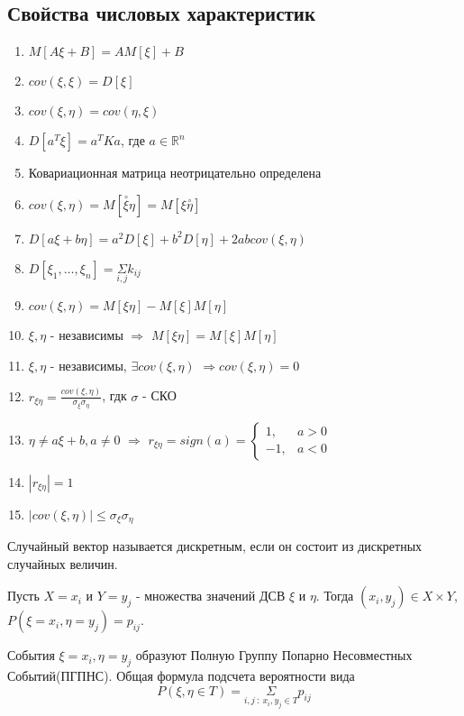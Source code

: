 \subsection{Свойства числовых характеристик}
\begin{enumerate}
    \item $M[A\xi + B] = AM[\xi] + B$
    \item $cov(\xi, \xi) = D[\xi]$
    \item $cov(\xi, \eta) = cov(\eta, \xi)$
    \item $D[a^T\xi] = a^TKa$, где $a \in \mathbb{R}^n$
    \item Ковариационная матрица неотрицательно определена
    \item $cov(\xi, \eta) = M[\overset{\circ}{\xi}\eta] = M[\xi\overset{\circ}{\eta}]$
    \item $D[a\xi + b\eta] = a^2D[\xi] + b^2D[\eta] + 2abcov(\xi, \eta)$
    \item $D[\xi_1, \ldots, \xi_n] = \underset{i,j}{\Sigma}k_{ij}$
    \item $cov(\xi, \eta) = M[\xi\eta] - M[\xi]M[\eta]$
    \item $\xi, \eta$ - независимы $\Rightarrow$ $M[\xi\eta] = M[\xi]M[\eta]$
    \item $\xi, \eta$ - независимы, $\exists cov(\xi, \eta)$ $\Rightarrow cov(\xi, \eta) = 0$
    \item $r_{\xi\eta} = \frac{cov(\xi, \eta)}{\sigma_{\xi}\sigma_{\eta}}$, гдк $\sigma$ - СКО
    \item $\eta \ne a\xi + b, a \ne 0$ $\Rightarrow$ $r_{\xi\eta} = sign(a) =
        \begin{cases}
            1, & a > 0 \\
            -1, & a < 0
        \end{cases}
        $
    \item $|r_{\xi\eta}| = 1$
    \item $|cov(\xi, \eta)| \leq \sigma_\xi\sigma_\eta$
\end{enumerate}

\begin{definition}
    Случайный вектор называется дискретным, если он состоит из дискретных случайных величин.
\end{definition}
Пусть $X = {x_i}$ и $Y = {y_j}$ - множества значений ДСВ $\xi$ и $\eta$. Тогда $(x_i, y_j) \in X \times Y$,
$P(\xi = x_i, \eta = y_j) = p_{ij}$.

События ${\xi = x_i, \eta = y_j}$ образуют Полную Группу Попарно Несовместных Событий(ПГПНС).
Общая формула подсчета вероятности вида
$$
P(\xi,\eta \in T) = \underset{i,j~:~x_i, y_j \in T}{\Sigma}p_{ij}
$$

